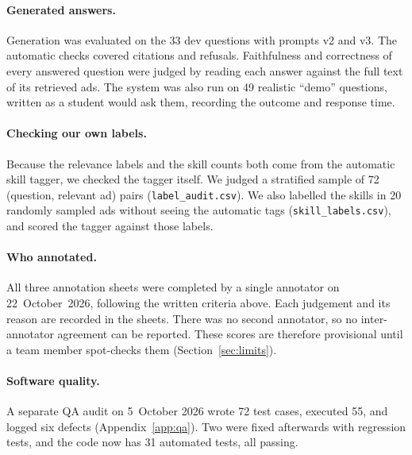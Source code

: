 \paragraph{Generated answers.} Generation was evaluated on the 33 dev questions with prompts v2 and v3. The automatic checks covered citations and refusals. Faithfulness and correctness of every answered question were judged by reading each answer against the full text of its retrieved ads. The system was also run on 49 realistic ``demo'' questions, written as a student would ask them, recording the outcome and response time.

\paragraph{Checking our own labels.} Because the relevance labels and the skill counts both come from the automatic skill tagger, we checked the tagger itself. We judged a stratified sample of 72 (question, relevant ad) pairs (\texttt{label\_audit.csv}). We also labelled the skills in 20 randomly sampled ads without seeing the automatic tags (\texttt{skill\_labels.csv}), and scored the tagger against those labels.

\paragraph{Who annotated.} All three annotation sheets were completed by a single annotator on 22~October~2026, following the written criteria above. Each judgement and its reason are recorded in the sheets. There was no second annotator, so no inter-annotator agreement can be reported. These scores are therefore provisional until a team member spot-checks them (Section~\ref{sec:limits}).

\paragraph{Software quality.} A separate QA audit on 5~October 2026 wrote 72 test cases, executed 55, and logged six defects (Appendix~\ref{app:qa}). Two were fixed afterwards with regression tests, and the code now has 31 automated tests, all passing.
